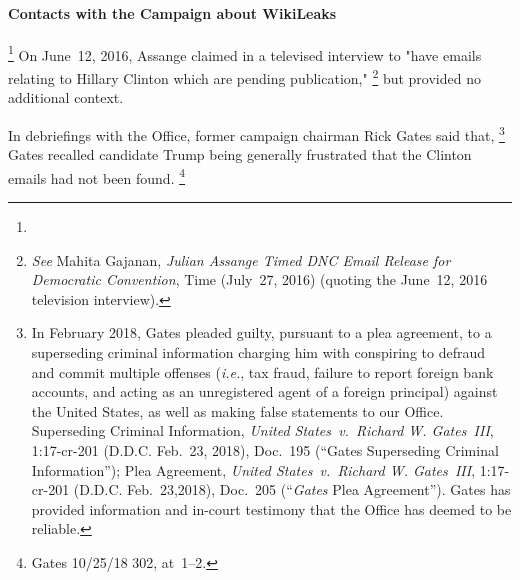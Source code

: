 \paragraph{Contacts with the Campaign about WikiLeaks}

\footnote{}
On June~12, 2016, Assange claimed in a televised interview to "have emails relating to Hillary Clinton which are pending publication,"%
\footnote{\textit{See} Mahita Gajanan, \textit{Julian Assange Timed DNC Email Release for Democratic Convention}, Time (July~27, 2016) (quoting the June~12, 2016 television interview).}
but provided no additional context.

In debriefings with the Office, former campaign chairman Rick Gates said that, %
\footnote{In February 2018, Gates pleaded guilty, pursuant to a plea agreement, to a superseding criminal information charging him with conspiring to defraud and commit multiple offenses (\textit{i.e.}, tax fraud, failure to report foreign bank accounts, and acting as an unregistered agent of a foreign principal) against the United States, as well as making false statements to our Office.
Superseding Criminal Information, \textit{United States~v.\ Richard W. Gates~III}, 1:17-cr-201 (D.D.C. Feb.~23, 2018), Doc.~195 (``Gates Superseding Criminal Information'');
Plea Agreement, \textit{United States~v.\ Richard W. Gates~III}, 1:17-cr-201 (D.D.C. Feb.~23,2018), Doc.~205 (``\textit{Gates} Plea Agreement'').
Gates has provided information and in-court testimony that the Office has deemed to be reliable.}
Gates recalled candidate Trump being generally frustrated that the Clinton emails had not been found.%
\footnote{Gates 10/25/18 302, at~1--2.}

